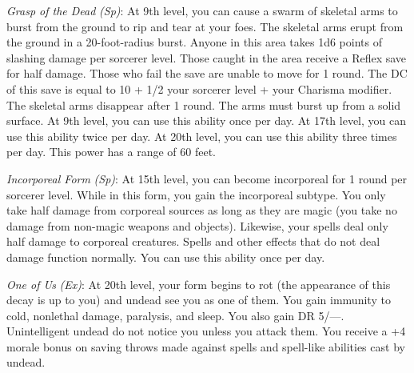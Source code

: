 \textit{Grasp of the Dead} \textit{(Sp)}: At 9th level, you can cause a swarm of skeletal arms to burst from the ground to rip and 
tear at your foes. The skeletal arms erupt from the ground in a 20-foot-radius burst. Anyone in this area takes 1d6 points of slashing
damage per sorcerer level. Those caught in the area receive a Reflex save for half damage. Those who fail the save are unable to move 
for 1 round. The DC of this save is equal to 10 + 1/2 your sorcerer level + your Charisma modifier. The skeletal arms disappear after
1 round. The arms must burst up from a solid surface. At 9th level, you can use this ability once per day. At 17th level, you can use
this ability twice per day. At 20th level, you can use this ability three times per day. This power has a range of 60 feet.
				
\textit{Incorporeal Form} \textit{(Sp)}: At 15th level, you can become incorporeal for 1 round per sorcerer level. While in this form,
you gain the incorporeal subtype. You only take half damage from corporeal sources as long as they are magic (you take no damage from
non-magic weapons and objects). Likewise, your spells deal only half damage to corporeal creatures. Spells and other effects that do
not deal damage function normally. You can use this ability once per day.
				
\textit{One of Us} \textit{(Ex)}: At 20th level, your form begins to rot (the appearance of this decay is up to you) and undead see
you as one of them. You gain immunity to cold, nonlethal damage, paralysis, and sleep. You also gain DR 5/---. Unintelligent undead
do not notice you unless you attack them. You receive a +4 morale bonus on saving throws made against spells and spell-like abilities
cast by undead.
	
